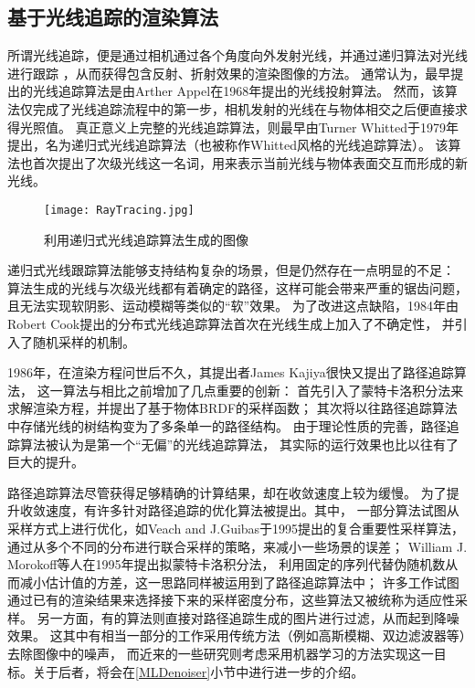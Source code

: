 \subsection{基于光线追踪的渲染算法}

所谓光线追踪，便是通过相机通过各个角度向外发射光线，并通过递归算法对光线进行跟踪
，从而获得包含反射、折射效果的渲染图像的方法。
通常认为，最早提出的光线追踪算法是由Arther Appel在1968年提出的光线投射算法\cite{Appel:1968:TSM:1468075.1468082}。
然而，该算法仅完成了光线追踪流程中的第一步，相机发射的光线在与物体相交之后便直接求得光照值。
真正意义上完整的光线追踪算法，则最早由Turner Whitted于1979年提出，名为递归式光线追踪算法\cite{whitted1979improved}（也被称作Whitted风格的光线追踪算法）。
该算法也首次提出了次级光线这一名词，用来表示当前光线与物体表面交互而形成的新光线。

\begin{figure}[h]
    \centering
    \texttt{[image: RayTracing.jpg]}
    \caption{利用递归式光线追踪算法生成的图像}
    \label{tab:rayTrace}
\end{figure}
 
递归式光线跟踪算法能够支持结构复杂的场景，但是仍然存在一点明显的不足：
算法生成的光线与次级光线都有着确定的路径，这样可能会带来严重的锯齿问题，
且无法实现软阴影、运动模糊等类似的“软”效果。
为了改进这点缺陷，1984年由Robert Cook提出的分布式光线追踪算法\cite{cook1984distributed}首次在光线生成上加入了不确定性，
并引入了随机采样的机制。

1986年，在渲染方程问世后不久，其提出者James Kajiya很快又提出了路径追踪算法，
这一算法与相比之前增加了几点重要的创新：
首先引入了蒙特卡洛积分法来求解渲染方程，并提出了基于物体BRDF的采样函数；
其次将以往路径追踪算法中存储光线的树结构变为了多条单一的路径结构。
由于理论性质的完善，路径追踪算法被认为是第一个“无偏”的光线追踪算法，
其实际的运行效果也比以往有了巨大的提升。

\label{PathTracingOptimization}
路径追踪算法尽管获得足够精确的计算结果，却在收敛速度上较为缓慢。
为了提升收敛速度，有许多针对路径追踪的优化算法被提出。其中，
一部分算法试图从采样方式上进行优化，如Veach and J.Guibas于1995提出的复合重要性采样\cite{Veach:1995:OCS:218380.218498}算法，
通过从多个不同的分布进行联合采样的策略，来减小一些场景的误差；
William J. Morokoff等人在1995年提出拟蒙特卡洛积分法\cite{Morokoff:1995:QCI:219503.219511}，
利用固定的序列代替伪随机数从而减小估计值的方差，这一思路同样被运用到了路径追踪算法中；
许多工作\cite{Belcour:2013:CTE:2487228.2487239}\cite{dammertz2010hierarchical}试图通过已有的渲染结果来选择接下来的采样密度分布，这些算法又被统称为适应性采样。
另一方面，有的算法则直接对路径追踪生成的图片进行过滤，从而起到降噪效果。
这其中有相当一部分的工作采用传统方法（例如高斯模糊、双边滤波器等）去除图像中的噪声\cite{Sen2012OnFT}\cite{Rousselle2011AdaptiveSA}，
而近来的一些研究则考虑采用机器学习的方法实现这一目标。关于后者，将会在\ref{MLDenoiser}小节中进行进一步的介绍。

